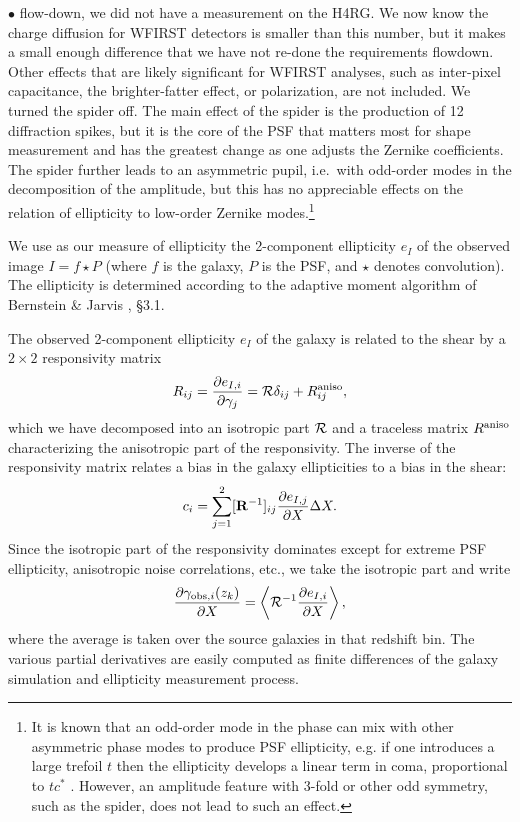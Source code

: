 \documentclass[aps,prd, amsmath,amssymb,superscriptaddress,showkeys,nofootinbib,reprint,preprintnumbers]{revtex4-1}
\begin{document}
\begin{widetext}
\begin{list}{$\bullet$}{}
{flow-down, we did not have a measurement on the H4RG. We now know the charge diffusion for WFIRST detectors is smaller than this number, but it makes a small enough difference that we have not re-done the requirements flowdown.} Other effects that are likely significant for WFIRST analyses, such as inter-pixel capacitance, the brighter-fatter effect, or polarization, are not included. We turned the spider off. The main effect of the spider is the production of 12 diffraction spikes, but it is the core of the PSF that matters most for shape measurement and has the greatest change as one adjusts the Zernike coefficients. The spider further leads to an asymmetric pupil, i.e.\ with odd-order modes in the decomposition of the amplitude, but this has no appreciable effects on the relation of ellipticity to low-order Zernike modes.\footnote{It is known that an odd-order mode in the phase can
mix with other asymmetric phase modes to produce PSF ellipticity,
e.g. if one introduces a large trefoil $t$ then the ellipticity
develops a linear term in coma, proportional to $tc^\ast$
\cite{2010SPIE.7731E..1EN}. However, an amplitude feature with 3-fold
or other odd symmetry, such as the spider, does not lead to such an
effect.}
\item We use as our measure of ellipticity the 2-component ellipticity $e_I$ of the observed image $I = f \star P$ (where $f$ is the galaxy, $P$ is the PSF, and $\star$ denotes convolution). The ellipticity is determined according to the adaptive moment algorithm of Bernstein \& Jarvis \cite{2002AJ....123..583B}, \S3.1.
\end{list}

The observed 2-component ellipticity $e_I$ of the galaxy is related to
the shear by a $2\times 2$ responsivity matrix
\begin{equation}
R_{ij} = \frac{\partial e_{I,i}}{\partial\gamma_j} = {\cal R}\delta_{ij} + R^{\rm aniso}_{ij},
\end{equation}
which we have decomposed into an isotropic part ${\cal R}$ and a
traceless matrix $R^{\rm aniso}$ characterizing the anisotropic part
of the responsivity. The inverse of the responsivity matrix relates a
bias in the galaxy ellipticities to a bias in the shear:
\begin{equation}
c_i = \sum_{j=1}^2 [{\bf R}^{-1}]_{ij} \frac{\partial e_{I,j}}{\partial X} \Delta X.
\end{equation}
Since the isotropic part of the responsivity dominates except for
extreme PSF ellipticity, anisotropic noise correlations, etc., we take
the isotropic part and write
\begin{equation}
\frac{\partial\gamma_{{\rm obs},i}(z_k)}{\partial X} = \left\langle {\cal R}^{-1} \frac{\partial e_{I,i}}{\partial X} \right\rangle,
\end{equation}
where the average is taken over the source galaxies in that redshift
bin. The various partial derivatives are easily computed as finite
differences of the galaxy simulation and ellipticity measurement
process.


\end{widetext}
\end{document}
